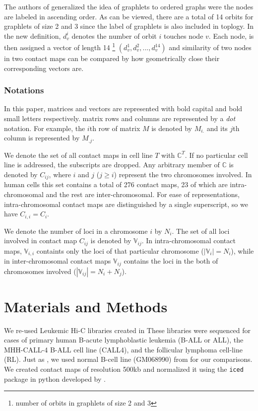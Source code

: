 \documentclass[a4,center,fleqn]{NAR}
\begin{document}
The authors of \cite{di2010fast} generalized the idea of graphlets to 
ordered graphs were the nodes are labeled in ascending order.
As can be viewed, there are a total of 14 orbits for graphlets of size
2 and 3 since the label of graphlets is also included in toplogy.
In the new definition, $d_v^i$ denotes the number of orbit $i$ touches 
node $v$. Each node, is then assigned a vector of length 14 
\footnote{number of orbits in graphlets of size 2 and 3}
$(d_v^1, d_v^2, ..., d_v^{14})$ 
and similarity of two nodes in two contact maps can be compared by
how geometrically close their corresponding vectors are.

\subsubsection{Notations}
In this paper, matrices and vectors are represented with bold
capital and bold small letters respectively.
matrix rows and columns are represented by a \textit{dot}
notation. For example, the $i$th row of matrix $M$ is
denoted by $M_{i.}$ and its $j$th column is represented
by $M_{.j}$.

We denote the set of all contact maps in cell line $T$ with 
$\mathbb{C}^T$. If no particular cell line is addressed, the
subscripts are dropped.
Any arbitrary member of $\mathbb{C}$ is denoted by 
$C_{ij}$, where $i$ and $j$ ($j \ge i$) represent the two chromosomes involved. 
In human cells this set contains a total of 276 contact maps,
23 of which are intra-chromosomal and the rest are inter-chromosomal.
For ease of representations, intra-chromosomal contact maps are
distinguished by a single superscript, so we have $C_{i,i} =
C_i$.

We denote the number of loci in a chromosome $i$ by $N_i$.
The set of all loci involved in contact map $C_{ij}$ is denoted 
by $\mathbb{V}_{ij}$.
In intra-chromosomal contact maps, $\mathbb{V}_{i,i}$ containts only the 
loci of that particular chromosome ($|\mathbb{V}_i| = N_i$), while in 
inter-chromosomal contact maps $\mathbb{V}_{ij}$ contains the loci in
the both of chromosomes involved ($|\mathbb{V}_{ij}| = N_i + N_j$).

\enlargethispage{-65.1pt}

\section{Materials and Methods}
We re-used Leukemic Hi-C libraries 
created in \cite{wang2013properties}
These libraries were sequenced 
for cases of primary human B-acute
lymphoblastic leukemia (B-ALL or ALL), 
the MHH-CALL-4 B-ALL cell
line (CALL4), 
and the follicular lymphoma cell-line (RL).
Just as \cite{wang2013properties}, 
we used normal B-cell line (GM068990)
from \cite{lieberman2009comprehensive} 
for our comparisons.
We created contact maps of resolution
500kb and normalized it using 
the \texttt{iced} package in python
developed by \cite{servant2015hic}.
\end{document}
